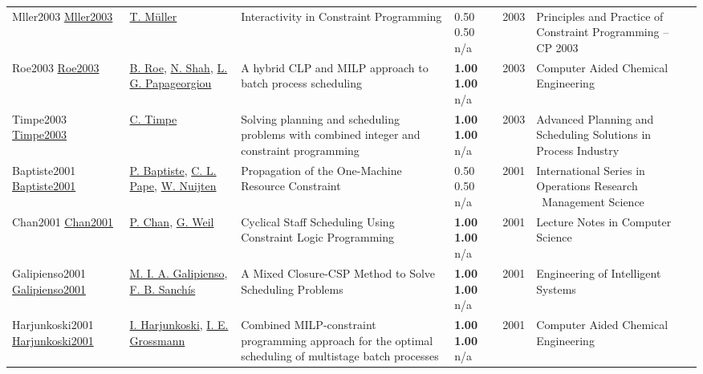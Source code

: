 {\begin{longtable}{p{3cm}p{5cm}p{10cm}p{1cm}rp{2.5cm}l}
Mller2003 \href{http://dx.doi.org/10.1007/978-3-540-45193-8_110}{Mller2003} & \hyperref[auth:a1953]{T. Müller} & \cellcolor{green!10}Interactivity in Constraint Programming & \noindent{}0.50 0.50 n/a & 2003 & Principles and Practice of Constraint Programming – CP 2003 & \cite{Mller2003}\\
Roe2003 \href{http://dx.doi.org/10.1016/s1570-7946(03)80608-9}{Roe2003} & \hyperref[auth:a1241]{B. Roe}, \hyperref[auth:a1243]{N. Shah}, \hyperref[auth:a1242]{L. G. Papageorgiou} & A hybrid CLP and MILP approach to batch process scheduling & \noindent{}\textbf{1.00} \textbf{1.00} n/a & 2003 & Computer Aided Chemical Engineering & \cite{Roe2003}\\
Timpe2003 \href{http://dx.doi.org/10.1007/978-3-662-05607-3_5}{Timpe2003} & \hyperref[auth:a673]{C. Timpe} & Solving planning and scheduling problems with combined integer and constraint programming & \noindent{}\textbf{1.00} \textbf{1.00} n/a & 2003 & Advanced Planning and Scheduling Solutions in Process Industry & \cite{Timpe2003}\\
Baptiste2001 \href{http://dx.doi.org/10.1007/978-1-4615-1479-4_2}{Baptiste2001} & \hyperref[auth:a162]{P. Baptiste}, \hyperref[auth:a163]{C. L. Pape}, \hyperref[auth:a656]{W. Nuijten} & Propagation of the One-Machine Resource Constraint & \noindent{}0.50 0.50 n/a & 2001 & International Series in Operations Research \  Management Science & \cite{Baptiste2001}\\
Chan2001 \href{http://dx.doi.org/10.1007/3-540-44629-x_10}{Chan2001} & \hyperref[auth:a1893]{P. Chan}, \hyperref[auth:a1852]{G. Weil} & Cyclical Staff Scheduling Using Constraint Logic Programming & \noindent{}\textbf{1.00} \textbf{1.00} n/a & 2001 & Lecture Notes in Computer Science & \cite{Chan2001}\\
Galipienso2001 \href{http://dx.doi.org/10.1007/3-540-45517-5_63}{Galipienso2001} & \hyperref[auth:a1878]{M. I. A. Galipienso}, \hyperref[auth:a1879]{F. B. Sanchís} & A Mixed Closure-CSP Method to Solve Scheduling Problems & \noindent{}\textbf{1.00} \textbf{1.00} n/a & 2001 & Engineering of Intelligent Systems & \cite{Galipienso2001}\\
Harjunkoski2001 \href{http://dx.doi.org/10.1016/s1570-7946(01)80140-1}{Harjunkoski2001} & \hyperref[auth:a871]{I. Harjunkoski}, \hyperref[auth:a382]{I. E. Grossmann} & Combined MILP-constraint programming approach for the optimal scheduling of multistage batch processes & \noindent{}\textbf{1.00} \textbf{1.00} n/a & 2001 & Computer Aided Chemical Engineering & \cite{Harjunkoski2001}\\

\end{longtable}}
